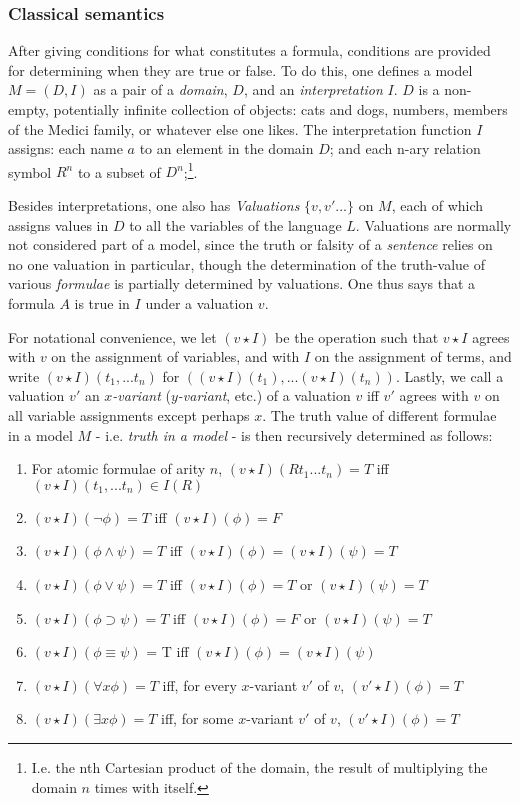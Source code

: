\documentclass[]{article}
\begin{document}
\subsubsection{Classical semantics}
After giving conditions for what constitutes a formula, conditions are provided for determining when they are true or false. To do this, one defines a model $M = (D, I)$ as a pair of a \textit{domain}, $D$, and an \textit{interpretation} $I$. $D$ is  a non-empty, potentially infinite collection of objects: cats and dogs, numbers, members of the Medici family, or whatever else one likes. The interpretation function $I$ assigns: each name $a$ to an element in the domain $D$; and each n-ary relation symbol $R^{n}$ to a subset of $D^{n}$;\footnote{I.e. the nth Cartesian product of the domain, the result of multiplying the domain $n$ times with itself.}. 

Besides interpretations, one also has \textit{Valuations} $\{v, v' ...\}$ on $M$, each of which assigns values in $D$ to all the variables of the language $L$. Valuations are normally not considered part of a model, since the truth or falsity of a \textit{sentence} relies on no one valuation in particular, though the determination of the truth-value of various \textit{formulae} is partially determined by valuations. One thus says that a formula $A$ is true in $I$ under a valuation $v$. 

For notational convenience, we let $(v \star I)$ be the operation such that $v \star I$ agrees with $v$ on the assignment of variables, and with $I$ on the assignment of terms, and write $(v \star I)(t_{1}, ...t_{n})$ for $((v \star I)(t_{1}), ... (v \star I)(t_{n}))$. Lastly, we call a valuation $v'$ an \textit{$x$-variant} (\textit{$y$-variant}, etc.) of a valuation $v$ iff $v'$ agrees with $v$ on all variable assignments except perhaps $x$. The truth value of different formulae in a model $M$ - i.e. \textit{truth in a model} - is then recursively determined as follows:

\begin{enumerate}
\item For atomic formulae of arity $n$, $(v \star I)(Rt_{1}...t_{n}) = T$ iff $(v \star I)(t_{1}, ... t_{n}) \in I(R)$
\item $(v \star I)(\neg\phi) = T$ iff $(v \star I)(\phi) = F$
\item $(v \star I)(\phi \wedge \psi) = T$ iff $(v \star I)(\phi) = (v \star I)(\psi) = T$
\item $(v \star I)(\phi \vee \psi) = T$ iff $(v \star I)(\phi) = T$ or $(v \star I)(\psi) = T$
\item $(v \star I)(\phi \supset \psi) = T$ iff $(v \star I)(\phi) = F$ or $(v \star I)(\psi) = T$
\item $(v \star I)(\phi \equiv \psi)$ = T iff $(v \star I)(\phi) = (v \star I)(\psi)$
\item $(v \star I)(\forall x \phi) = T$ iff, for every $x$-variant $v'$ of $v$, $(v' \star I)(\phi) = T$
\item $(v \star I)(\exists x \phi) = T$ iff, for some $x$-variant $v'$ of $v$, $(v' \star I)(\phi) = T$
\end{enumerate}
\end{document}
